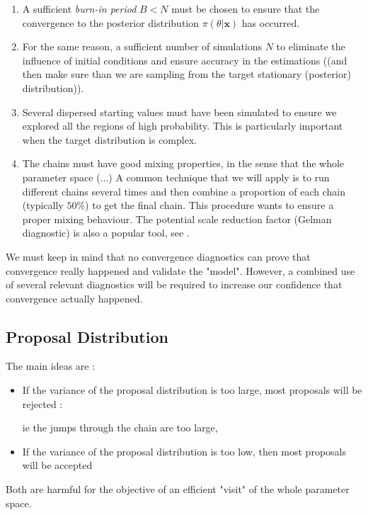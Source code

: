 \documentclass[11pt,a4paper,openany ]{book}
\begin{document}
\begin{enumerate}
	\item A sufficient \emph{burn-in period} $B<N$ must be chosen to ensure that the convergence to the posterior distribution $\pi(\theta|\boldsymbol{x})$ has occurred. 
	\item For the same reason, a sufficient number of simulations $N$ to eliminate the influence of initial conditions and ensure accuracy in the estimations ((and then make sure than we are sampling from the target stationary (posterior) distribution)).
	\item Several dispersed starting values must have been simulated to ensure we explored all the regions of high probability. This is particularly important when the target distribution is complex.
	\item\label{convdiag4} The chains must have good mixing properties, in the sense that the whole parameter space (...) 
	A common technique that we will apply is to run different chains several times and then combine a proportion of each chain (typically $50\%$) to get the final chain. This procedure wants to ensure a proper mixing behaviour. 
	The potential scale reduction factor (Gelman diagnostic) is also a popular tool, see .
\end{enumerate}

We must keep in mind that no convergence diagnostics can prove that convergence really happened and validate the "model".
However, a combined use of several relevant diagnostics will be required to increase our confidence that convergence actually happened.

\subsection{Proposal Distribution}



The main ideas are : 

\begin{itemize}
	\item If the variance of the proposal distribution is too large, most proposals will be rejected : 
	
	 ie the jumps through the chain are too large,
	\item If the variance of the proposal distribution is too low, then most proposals will be accepted
\end{itemize}

Both are harmful for the objective of an efficient "visit" of the whole parameter space. 
\end{document}
